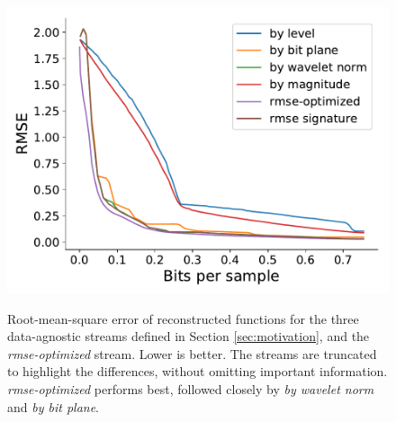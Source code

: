 \begin{figure}[h]
 	{\includegraphics[width=0.48\linewidth]{img/rmse/rmse-optimized-velocityz.pdf}}
 	\caption{Root-mean-square error of reconstructed functions for the three data-agnostic streams
 	defined in Section \ref{sec:motivation}, and the \emph{rmse-optimized} stream. Lower is better.
 	The streams are truncated to highlight the differences, without omitting important information.
 	\emph{rmse-optimized} performs best, followed closely by \emph{by wavelet norm} and \emph{by bit
 	plane}.}
 	\label{fig:rmse-optimized}
\end{figure}

